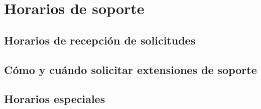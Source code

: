 \section{Horarios de soporte}


\subsection{Horarios de recepci\'on de solicitudes}

\subsection{C\'omo y cu\'ando solicitar extensiones de soporte}

\subsection{Horarios especiales}
